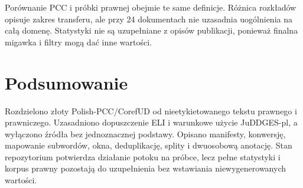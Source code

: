 Porównanie PCC i próbki prawnej obejmie te same definicje. Różnica rozkładów opisuje zakres transferu, ale przy 24 dokumentach nie uzasadnia uogólnienia na całą domenę. Statystyki nie są uzupełniane z opisów publikacji, ponieważ finalna migawka i filtry mogą dać inne wartości.

\section{Podsumowanie}

Rozdzielono złoty Polish-PCC/CorefUD od nieetykietowanego tekstu prawnego i prawniczego. Uzasadniono dopuszczenie ELI i warunkowe użycie JuDDGES-pl, a wyłączono źródła bez jednoznacznej podstawy. Opisano manifesty, konwersję, mapowanie subwordów, okna, deduplikację, splity i dwuosobową anotację. Stan repozytorium potwierdza działanie potoku na próbce, lecz pełne statystyki i korpus prawny pozostają do uzupełnienia bez wstawiania niewygenerowanych wartości.
